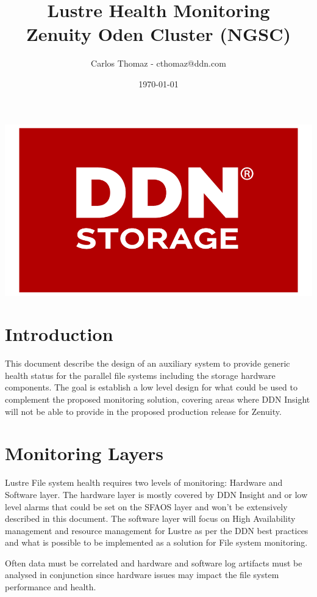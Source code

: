 \documentclass{article}
\title{%
Lustre Health Monitoring \\
\large Zenuity Oden Cluster (NGSC)}
\author{Carlos Thomaz - cthomaz@ddn.com}
\date{\today}
\begin{document}
\maketitle


\begin{center}
    \includegraphics[scale=0.14]{logo.png}\\[1cm] 
\end{center}

\newpage

\begin{versionhistory}
\end{versionhistory}


\newpage
\section{Introduction}

This document describe the design of an auxiliary system to provide generic health status for the parallel file systems including the storage hardware components. The goal is establish a low level design for what could be used to complement the proposed monitoring solution, covering areas where DDN Insight will not be able to provide in the proposed production release for Zenuity.

\section{Monitoring Layers}
Lustre File system health requires two levels of monitoring: Hardware and Software layer. The hardware layer is mostly covered by DDN Insight and or low level alarms that could be set on the SFAOS layer and won't be extensively described in this document. The software layer will focus on High Availability management and resource management for Lustre as per the DDN best practices and what is possible to be implemented as a solution for File system monitoring.

Often data must be correlated and hardware and software log artifacts must be analysed in conjunction since hardware issues may impact the file system performance and health.
\end{document}
